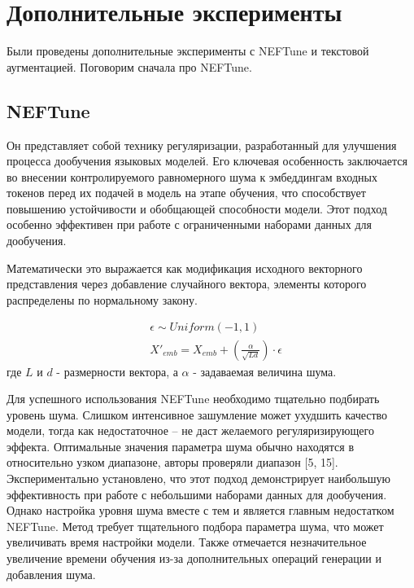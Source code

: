 \section{Дополнительные эксперименты}

Были проведены дополнительные эксперименты с NEFTune\cite{jain2023neftune} и текстовой аугментацией.
Поговорим сначала про NEFTune.

\subsection{NEFTune}
Он представляет собой технику регуляризации, разработанный для улучшения процесса дообучения языковых моделей.
Его ключевая особенность заключается во внесении контролируемого равномерного шума к эмбеддингам входных токенов перед их подачей в модель на этапе обучения, что способствует повышению устойчивости и обобщающей способности модели.
Этот подход особенно эффективен при работе с ограниченными наборами данных для дообучения.

Математически это выражается как модификация исходного векторного представления через добавление случайного вектора, элементы которого распределены по нормальному закону.

\begin{equation}
  \begin{aligned}
    &\epsilon \sim Uniform(-1, 1) \\
    &X'_{emb} = X_{emb} + (\frac{\alpha}{\sqrt{Ld}})\cdot\epsilon  
  \end{aligned}
  \label{eq:neftune}
\end{equation}
где $L$ и $d$ - размерности вектора, а $\alpha$ - задаваемая величина шума.

Для успешного использования NEFTune необходимо тщательно подбирать уровень шума.
Слишком интенсивное зашумление может ухудшить качество модели, тогда как недостаточное -- не даст желаемого регуляризирующего эффекта.
Оптимальные значения параметра шума обычно находятся в относительно узком диапазоне, авторы проверяли диапазон [5, 15].
Экспериментально установлено, что этот подход демонстрирует наибольшую эффективность при работе с небольшими наборами данных для дообучения.
Однако настройка уровня шума вместе с тем и является главным недостатком NEFTune.
Метод требует тщательного подбора параметра шума, что может увеличивать время настройки модели.
Также отмечается незначительное увеличение времени обучения из-за дополнительных операций генерации и добавления шума.


